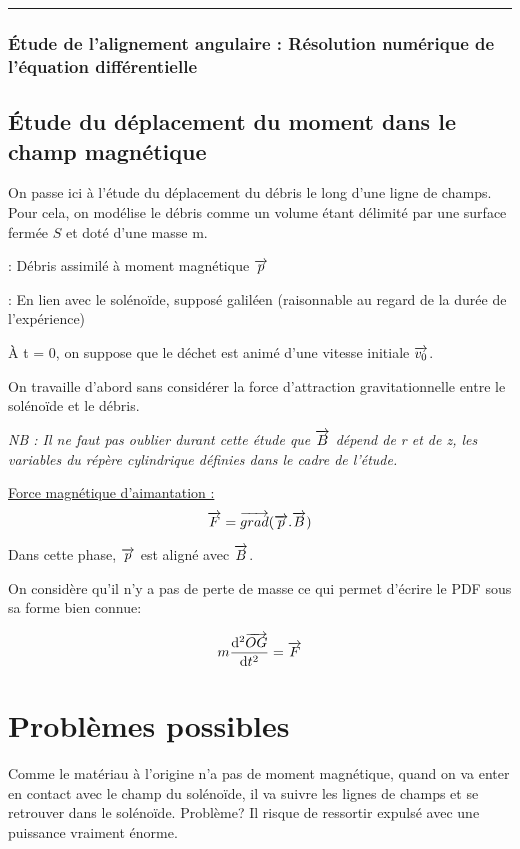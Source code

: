 \rule{\textwidth}{0.4pt}

\subsubsection{Étude de l'alignement angulaire : Résolution numérique de l'équation différentielle}

\subsection{Étude du déplacement du moment dans le champ magnétique}

On passe ici à l'étude du déplacement du débris le long d'une ligne de champs. Pour cela, on modélise le débris comme un volume étant délimité par une surface fermée $S$ et doté d'une masse m.

: {Débris assimilé à moment magnétique $\overrightarrow{p}$}

: En lien avec le solénoïde, supposé galiléen (raisonnable au regard de la durée de l'expérience)


À t = 0, on suppose que le déchet est animé d'une vitesse initiale $\overrightarrow{v_0}$.


On travaille d'abord sans considérer la force d'attraction gravitationnelle entre le solénoïde et le débris.


\emph{NB : Il ne faut pas oublier durant cette étude que $\overrightarrow{B}$ dépend de r et de z, les variables du répère cylindrique définies dans le cadre de l'étude.}

\underline{Force magnétique d'aimantation :} 
$$\overrightarrow{F} = \overrightarrow{grad}(\overrightarrow{p}.\overrightarrow{B})$$

Dans cette phase, $\overrightarrow{p}$ est aligné avec $\overrightarrow{B}$.


On considère qu'il n'y a pas de perte de masse ce qui permet d'écrire le PDF sous sa forme bien connue:

$$m\frac{\mathrm{d^2}\overrightarrow{OG}}{\mathrm{d}t^2} = \overrightarrow{F}$$


\section{Problèmes possibles}
Comme le matériau à l'origine n'a pas de moment magnétique, quand on va enter en contact avec le champ du solénoïde, il va suivre les lignes de champs et se retrouver dans le solénoïde. Problème? Il risque de ressortir expulsé avec une puissance vraiment énorme.
